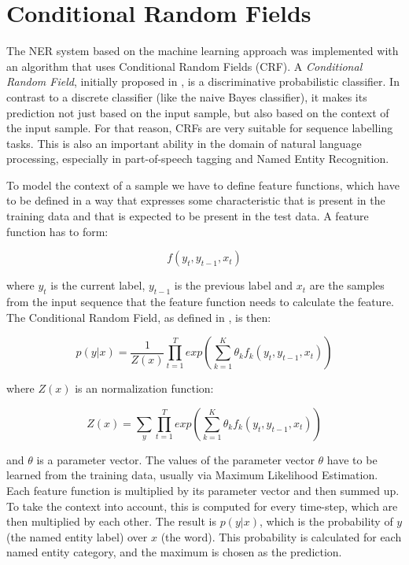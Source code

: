 \documentclass[12pt]{book}
\begin{document}
	
	\section{Conditional Random Fields}
	\label{sec:crf}
	
	The NER system based on the machine learning approach was implemented with an algorithm that uses Conditional Random Fields (CRF).
	A \textit{Conditional Random Field}, initially proposed in \cite{lafferty2001conditional}, is a discriminative probabilistic classifier. In contrast to a discrete classifier (like the naive Bayes classifier), it makes its prediction not just based on the input sample, but also based on the context of the input sample. For that reason, CRFs are very suitable for sequence labelling tasks. This is also an important ability in the domain of natural language processing, especially in part-of-speech tagging and Named Entity Recognition. 
	
	To model the context of a sample we have to define feature functions, which have to be defined in a way that expresses some characteristic that is present in the training data and that is expected to be present in the test data. A feature function has to form:
	
	\begin{equation}
	f(y_t, y_{t-1}, x_t)
	\end{equation}
	
	where $y_t$ is the current label, $y_{t-1}$ is the previous label and $x_t$ are the samples from the input sequence that the feature function needs to calculate the feature. The Conditional Random Field, as defined in \cite{MAL-013}, is then:
	
	\begin{equation}
	p(y|x) = \frac{1}{Z(x)} \prod_{t=1}^T exp(\sum_{k=1}^{K} \theta_k f_k(y_t, y_{t-1}, x_t))
	\end{equation}
	
	where $Z(x)$ is an normalization function:
	
	\begin{equation}
	Z(x) = \sum_{y} \prod_{t=1}^{T} exp(\sum_{k=1}^{K} \theta_k f_k(y_t, y_{t-1}, x_t))
	\end{equation}
	
	and $\theta$ is a parameter vector. The values of the parameter vector $\theta$ have to be learned from the training data, usually via Maximum Likelihood Estimation. Each feature function is multiplied by its parameter vector and then summed up. To take the context into account, this is computed for every time-step, which are then multiplied by each other. The result is $p(y|x)$, which is the probability of $y$ (the named entity label) over $x$ (the word). This probability is calculated for each named entity category, and the maximum is chosen as the prediction.
	
\end{document}
